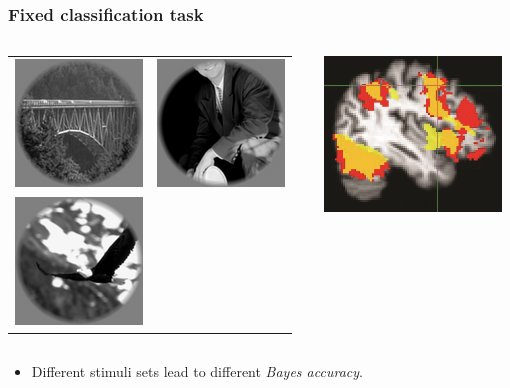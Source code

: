 \documentclass{beamer}
\begin{document}
\begin{frame}
\frametitle{Fixed classification task}
\begin{columns}
\begin{column}{0.6\textwidth}
\begin{tabular}{cc}
\includegraphics[scale = 0.5]{img1.png} &
\includegraphics[scale = 0.5]{img2.png} \\
\includegraphics[scale = 0.5]{img3.png} &
\end{tabular}
\end{column}
\begin{column}{0.4\textwidth}
\includegraphics[scale = 0.5]{smbrain1.png}
\end{column}
\end{columns}
\begin{itemize}
\item Different stimuli sets lead to different \emph{Bayes accuracy}.
\end{itemize}
\end{frame}
\end{document}
